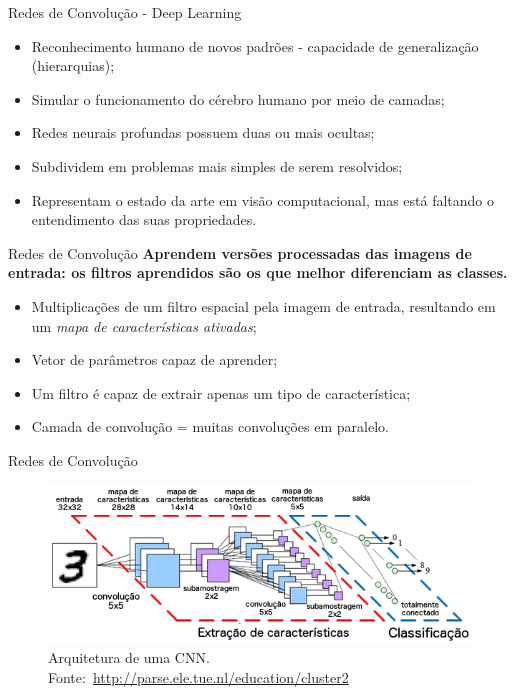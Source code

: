 \documentclass{beamer}
\begin{document}
\begin{frame}{Redes de Convolução - Deep Learning}
\setlength\leftmargini{0em}
\justifying 
\begin{itemize}
  \item Reconhecimento humano de novos padrões - capacidade de generalização (hierarquias);%
  \item Simular o funcionamento do cérebro humano por meio de camadas;
  \item Redes neurais profundas possuem duas ou mais ocultas; %
  \item Subdividem em problemas mais simples de serem resolvidos;
  \item Representam o estado da arte em visão computacional, mas está faltando o entendimento das suas propriedades.
\end{itemize}
\end{frame}
\begin{frame}{Redes de Convolução}
\setlength\leftmargini{0em}
\justifying
\textbf{Aprendem versões processadas das imagens de entrada: os filtros aprendidos são os que melhor diferenciam as classes.}
\vspace{1cm}
\begin{itemize}
  \item Multiplicações de um filtro espacial pela imagem de entrada, resultando em um \emph{mapa de características ativadas}; 
  \item Vetor de parâmetros capaz de aprender;
  \item Um filtro é capaz de extrair apenas um tipo de característica;
  \item Camada de convolução = muitas convoluções em paralelo.
\end{itemize}
\end{frame}
\begin{frame}{Redes de Convolução}
 \begin{figure}[hbpt]
 \begin{center}
   \includegraphics[width=0.9\linewidth]{figuras/CNNArchitecture.png}
 \end{center}
  \caption{Arquitetura de uma CNN. Fonte:~\tiny{\url{http://parse.ele.tue.nl/education/cluster2}}}
\end{figure}
\end{frame}
\end{document}
